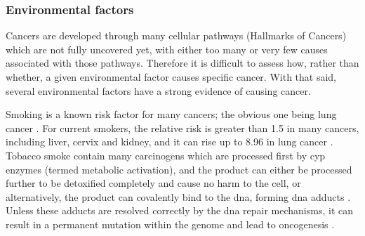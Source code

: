 \subsubsection{Environmental factors}
\label{ssub:environmental_factors}

Cancers are developed through many cellular pathways (Hallmarks of Cancers) which are not fully uncovered yet, with either too many or very few causes associated with those pathways.
Therefore it is difficult to assess how, rather than whether, a given environmental factor causes specific cancer.
With that said, several environmental factors have a strong evidence of causing cancer.

Smoking is a known risk factor for many cancers; the obvious one being lung cancer \citep{Gandini2008,Hecht1999}.
For current smokers, the relative risk is greater than 1.5 in many cancers, including liver, cervix and kidney, and it can rise up to 8.96 in lung cancer \citep{Gandini2008}.
Tobacco smoke contain many carcinogens which are processed first by \gls{cyp} enzymes (termed meta\-bolic activation), and the product can either be processed further to be detoxified completely and cause no harm to the cell, or alternatively, the product can covalently bind to the \acrshort{dna}, forming \acrshort{dna} adducts \citep{Hecht1999}.
Unless these adducts are resolved correctly by the \acrshort{dna} repair mechanisms, it can result in a permanent mutation within the genome and lead to oncogenesis \citep{Hecht1999}.

